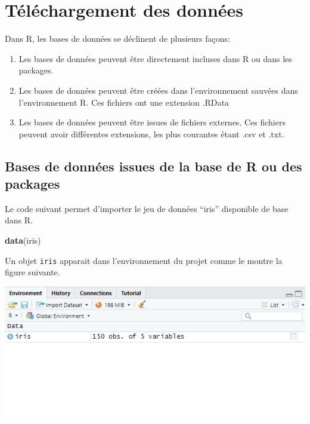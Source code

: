 \documentclass[
]{book}
\newenvironment{Shaded}{\begin{snugshade}}{\end{snugshade}}
\newcommand{\FunctionTok}[1]{\textcolor[rgb]{0.13,0.29,0.53}{\textbf{#1}}}
\newcommand{\NormalTok}[1]{#1}
\providecommand{\tightlist}{%
  \setlength{\itemsep}{0pt}\setlength{\parskip}{0pt}}
\begin{document}
\section{Téléchargement des données}\label{tuxe9luxe9chargement-des-donnuxe9es}

Dans R, les bases de données se déclinent de plusieurs façons:

\begin{enumerate}
\def\labelenumi{\arabic{enumi}.}
\tightlist
\item
  Les bases de données peuvent être directement incluses dans R ou dans les packages.
\item
  Les bases de données peuvent être créées dans l'environnement sauvées dans l'environnement R. Ces fichiers ont une extension .RData
\item
  Les bases de données peuvent être issues de fichiers externes. Ces fichiers peuvent avoir différentes extensions, les plus courantes étant .csv et .txt.
\end{enumerate}

\subsection{Bases de données issues de la base de R ou des packages}\label{bases-de-donnuxe9es-issues-de-la-base-de-r-ou-des-packages}

Le code suivant permet d'importer le jeu de données ``iris'' disponible de base dans R.

\begin{Shaded}
\begin{Highlighting}[]
\FunctionTok{data}\NormalTok{(iris)}
\end{Highlighting}
\end{Shaded}

Un objet \texttt{iris} apparait dans l'environnement du projet comme le montre la figure suivante.

\includegraphics[width=8.39in]{images/environment_forDataDownload}
\end{document}
